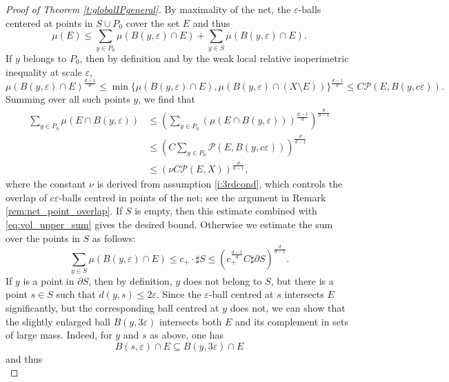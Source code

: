 \documentclass[10pt,letterpaper]{amsart}
\theoremstyle{definition}
\numberwithin{thm}{subsection}
\numberwithin{equation}{section}
\begin{document}
\begin{proof}[Proof of Theorem \ref{t:globalIPgeneral}]
By maximality of the net, the $\varepsilon$-balls centered at points in $S\cup P_0$ cover the set $E$ and thus
\begin{equation}\label{eq:vol_upper_sum}
\mu(E) \leq \sum_{y\in P_0} \mu(B(y,\varepsilon)\cap E) + \sum_{y\in S} \mu(B(y,\varepsilon)\cap E).
\end{equation}
If $y$ belongs to $P_0$, then by definition and by the weak local relative isoperimetric inequality at scale $\varepsilon$,
\begin{displaymath}
\mu(B(y,\varepsilon)\cap E)^{\frac{d-1}{d}} \leq \min\{\mu(B(y,\varepsilon)\cap E),\mu(B(y,\varepsilon)\cap (X\setminus E))\}^{\frac{d-1}{d}}\leq C \mathcal{P}(E,B(y,c\varepsilon)).
\end{displaymath}
Summing over all such points $y$, we find that
\begin{align*}
\sum_{y\in P_0} \mu(E\cap B(y,\varepsilon))&\leq \left(\sum_{y\in P_0}\left(\mu(E\cap B(y,\varepsilon))\right)^{\frac{d-1}{d}}\right)^{\frac{d}{d-1}}\\
&\leq \left(C \sum_{y\in P_0}\mathcal{P}(E,B(y,c\varepsilon)) \right)^{\frac{d}{d-1}}\\
&\leq \left(\nu C \mathcal{P}(E,X)\right)^{\frac{d}{d-1}},
\end{align*}
where the constant $\nu$ is derived from assumption \eqref{i:3rdcond}, which controls the overlap of $c\varepsilon$-balls centred in points of the net; see the argument in Remark \ref{rem:net_point_overlap}. If $S$ is empty, then this estimate combined with \eqref{eq:vol_upper_sum} gives the desired bound. Otherwise we estimate the sum over the points in $S$ as follows:
\begin{equation}\label{eq:S_sum}
\sum_{y\in S} \mu(B(y,\varepsilon)\cap E) \leq c_{+} \cdot \sharp S \leq \left(c_{+}^{\frac{d-1}{d}} C \sharp \partial S\right)^{\frac{d}{d-1}}.
\end{equation}
If $y$ is a point in $\partial S$, then by definition, $y$ does not belong to $S$, but there is a point $s\in S$ such that $d(y,s)\leq 2\varepsilon$.
Since the $\varepsilon$-ball centred at $s$ intersects $E$ significantly, but the corresponding ball centred at $y$ does not, we can show that the slightly enlarged ball $B(y,3\varepsilon)$ intersects both $E$ and its
complement in sets of large mass. Indeed, for $y$ and $s$ as above, one has
\begin{displaymath}
B(s,\varepsilon)\cap E \subseteq B(y,3\varepsilon) \cap E
\end{displaymath}
and thus
\begin{equation}\label{eq:vol_est1}

\end{equation}
\end{proof}
\end{document}
